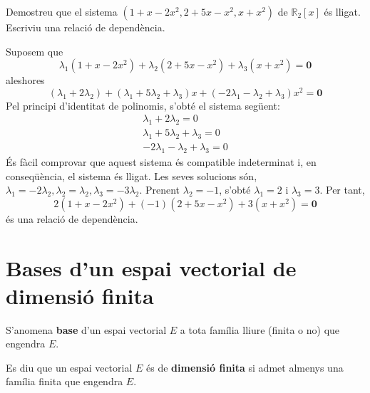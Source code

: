 \begin{exemple}
Demostreu que el sistema $(1+x-2x^{2},2+5x-x^{2},x+x^{2})$ de $\mathbb{R}_{2}%
\left[ x\right] $ és lligat. Escriviu una relació de dependència.

\end{exemple}
\begin{solucio}
Suposem que%
\begin{equation*}
\lambda _{1}(1+x-2x^{2})+\lambda _{2}(2+5x-x^{2})+\lambda _{3}(x+x^{2})=%
\mathbf{0}
\end{equation*}%
aleshores%
\begin{equation*}
(\lambda _{1}+2\lambda _{2})+(\lambda _{1}+5\lambda _{2}+\lambda
_{3})x+(-2\lambda _{1}-\lambda _{2}+\lambda _{3})x^{2}=\mathbf{0}
\end{equation*}%
Pel principi d'identitat de polinomis, s’obté el sistema següent:%
\begin{equation*}
\begin{array}{r}
\lambda _{1}+2\lambda _{2}=0 \\ 
\lambda _{1}+5\lambda _{2}+\lambda _{3}=0 \\ 
-2\lambda _{1}-\lambda _{2}+\lambda _{3}=0%
\end{array}%
\end{equation*}%
És fàcil comprovar que aquest sistema és compatible indeterminat i, en
conseqüència, el sistema és lligat. Les seves solucions són, $\lambda
_{1}=-2\lambda _{2},\lambda _{2}=\lambda _{2},\lambda _{3}=-3\lambda _{2}$.
Prenent $\lambda _{2}=-1$, s’obté $\lambda _{1}=2$ i $\lambda _{3}=3$.
Per tant,%
\begin{equation*}
2(1+x-2x^{2})+(-1)(2+5x-x^{2})+3(x+x^{2})=\mathbf{0}
\end{equation*}%
és una relació de dependència.
\end{solucio}

\section{Bases d’un espai vectorial de dimensió finita}

\begin{definicio}
S’anomena \textbf{base} d’un espai vectorial \thinspace $E$ a
tota família lliure (finita o no) que engendra $E$.
\end{definicio}

\begin{definicio}
Es diu que un espai vectorial $E$ és de \textbf{dimensió
finita} si admet almenys una família finita que engendra $E$.
\end{definicio}

